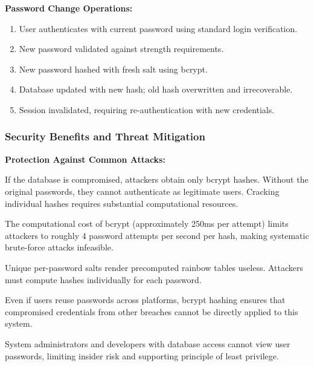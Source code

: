 \documentclass[12pt,a4paper]{article}
\begin{document}
\begin{tcolorbox}[colback=primaryblue!5, colframe=primaryblue, boxrule=1pt, arc=3pt, left=10pt, right=10pt, top=8pt, bottom=8pt]
\vspace{0.5em}

\textbf{Password Change Operations:}

\begin{enumerate}[leftmargin=2em, itemsep=6pt]
    \item User authenticates with current password using standard login verification.
    \item New password validated against strength requirements.
    \item New password hashed with fresh salt using bcrypt.
    \item Database updated with new hash; old hash overwritten and irrecoverable.
    \item Session invalidated, requiring re-authentication with new credentials.
\end{enumerate}

\subsubsection{Security Benefits and Threat Mitigation}

\textbf{Protection Against Common Attacks:}

\begin{description}[leftmargin=2em, itemsep=8pt, style=nextline]
    \item[\textbf{Database Breach:}] If the database is compromised, attackers obtain only bcrypt hashes. Without the original passwords, they cannot authenticate as legitimate users. Cracking individual hashes requires substantial computational resources.
    
    \item[\textbf{Brute-Force Attacks:}] The computational cost of bcrypt (approximately 250ms per attempt) limits attackers to roughly 4 password attempts per second per hash, making systematic brute-force attacks infeasible.
    
    \item[\textbf{Rainbow Table Attacks:}] Unique per-password salts render precomputed rainbow tables useless. Attackers must compute hashes individually for each password.
    
    \item[\textbf{Credential Stuffing:}] Even if users reuse passwords across platforms, bcrypt hashing ensures that compromised credentials from other breaches cannot be directly applied to this system.
    
    \item[\textbf{Insider Threats:}] System administrators and developers with database access cannot view user passwords, limiting insider risk and supporting principle of least privilege.
\end{description}


\end{tcolorbox}
\end{document}
